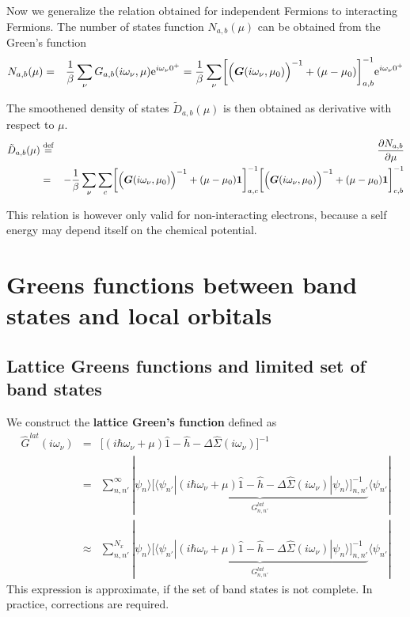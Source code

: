 \documentclass[11pt,a4paper]{report}
\begin{document}
Now we generalize the relation obtained for independent Fermions to
interacting Fermions. The number of states function $N_{a,b}(\mu)$ can
be obtained from the Green's function
\begin{eqnarray}
N_{a,b}(\mu)
&=&\frac{1}{\beta}\sum_\nu G_{a,b}(i\omega_\nu,\mu)\mathrm{e}^{i\omega_\nu0^+}
=\frac{1}{\beta}\sum_\nu 
\biggl[
\Bigl(\bm{G}(i\omega_\nu,\mu_0)
\Bigr)^{-1}+(\mu-\mu_0)\biggr]^{-1}_{a,b}\mathrm{e}^{i\omega_\nu0^+}
\end{eqnarray}

The smoothened density of states $\tilde{D}_{a,b}(\mu)$ is then
obtained as derivative with respect to $\mu$.
\begin{eqnarray}
\tilde{D}_{a,b}(\mu)&\stackrel{\text{def}}{=}&\frac{\partial N_{a,b}}{\partial\mu}
\nonumber\\
&=&
-\frac{1}{\beta}\sum_\nu 
\sum_c
\biggl[
\Bigl(\bm{G}(i\omega_\nu,\mu_0)
\Bigr)^{-1}+(\mu-\mu_0)\bm{1}\biggr]^{-1}_{a,c}
\biggl[
\Bigl(\bm{G}(i\omega_\nu,\mu_0)
\Bigr)^{-1}+(\mu-\mu_0)\bm{1}\biggr]^{-1}_{c,b}
\nonumber\\
\end{eqnarray}

This relation is however only valid for non-interacting electrons,
because a self energy may depend itself on the chemical potential.

\section{Greens functions between band states and local orbitals}
\subsection{Lattice Greens functions and limited set of band states}
We construct the \textbf{lattice Green's function} defined as
\begin{eqnarray}
\hat{G}^{lat}(i\omega_\nu)&=&
\biggl[(i\hbar\omega_\nu+\mu)\hat{1}
-\hat{h}-\Delta\hat{\Sigma}(i\omega_\nu)\biggr]^{-1}
\nonumber\\
&=&\sum_{n,n'}^\infty|\psi_n\rangle
\underbrace{
\biggl[\langle\psi_{n'}|(i\hbar\omega_\nu+\mu)\hat{1}-\hat{h}
-\Delta\hat{\Sigma}(i\omega_\nu)|\psi_n\rangle\biggr]_{n,n'}^{-1}
}_{G^{lat}_{n,n'}}
\langle\psi_{n'}|
\nonumber\\
&\approx&\sum_{n,n'}^{N_x}|\psi_n\rangle
\underbrace{
\biggl[\langle\psi_{n'}|(i\hbar\omega_\nu+\mu)\hat{1}-\hat{h}
-\Delta\hat{\Sigma}(i\omega_\nu)|\psi_n\rangle\biggr]_{n,n'}^{-1}
}_{G^{lat}_{n,n'}}
\langle\psi_{n'}|
\label{eq:latgreenfunc}
\end{eqnarray}
This expression is approximate, if the set of band states is not
complete. In practice, corrections are required.
\end{document}
